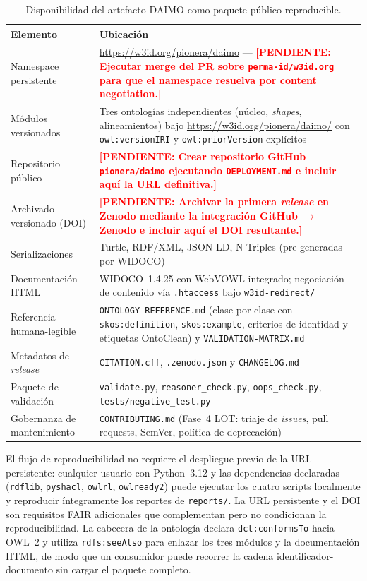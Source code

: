 \documentclass[11pt,a4paper]{article}
\newcommand{\code}[1]{\texttt{#1}}
\newcommand{\TODO}[1]{\textcolor{red}{\textbf{[PENDIENTE: #1]}}}
\begin{document}
\begin{table}[t]
\small\sf\centering
\caption{Disponibilidad del artefacto DAIMO como paquete público reproducible.\label{tab:avail}}
\begin{tabular}{@{}p{4cm}p{11cm}@{}}
\toprule
\textbf{Elemento} & \textbf{Ubicación} \\
\midrule
Namespace persistente & \url{https://w3id.org/pionera/daimo} --- \TODO{Ejecutar merge del PR sobre \texttt{perma-id/w3id.org} para que el namespace resuelva por content negotiation.} \\
Módulos versionados & Tres ontologías independientes (núcleo, \emph{shapes}, alineamientos) bajo \url{https://w3id.org/pionera/daimo/} con \code{owl:versionIRI} y \code{owl:priorVersion} explícitos \\
Repositorio público & \TODO{Crear repositorio GitHub \texttt{pionera/daimo} ejecutando \texttt{DEPLOYMENT.md} e incluir aquí la URL definitiva.} \\
Archivado versionado (DOI) & \TODO{Archivar la primera \emph{release} en Zenodo mediante la integración GitHub $\to$ Zenodo e incluir aquí el DOI resultante.} \\
Serializaciones & Turtle, RDF/XML, JSON-LD, N-Triples (pre-generadas por WIDOCO) \\
Documentación HTML & WIDOCO~1.4.25 con WebVOWL integrado; negociación de contenido vía \code{.htaccess} bajo \code{w3id-redirect/} \\
Referencia humana-legible & \code{ONTOLOGY-REFERENCE.md} (clase por clase con \code{skos:definition}, \code{skos:example}, criterios de identidad y etiquetas OntoClean) y \code{VALIDATION-MATRIX.md} \\
Metadatos de \emph{release} & \code{CITATION.cff}, \code{.zenodo.json} y \code{CHANGELOG.md} \\
Paquete de validación & \code{validate.py}, \code{reasoner\_check.py}, \code{oops\_check.py}, \code{tests/negative\_test.py} \\
Gobernanza de mantenimiento & \code{CONTRIBUTING.md} (Fase~4 LOT: triaje de \emph{issues}, pull requests, SemVer, política de deprecación) \\
\bottomrule
\end{tabular}
\end{table}

El flujo de reproducibilidad no requiere el despliegue previo de la URL persistente: cualquier usuario con Python~3.12 y las dependencias declaradas (\code{rdflib}, \code{pyshacl}, \code{owlrl}, \code{owlready2}) puede ejecutar los cuatro scripts localmente y reproducir íntegramente los reportes de \code{reports/}. La URL persistente y el DOI son requisitos FAIR adicionales que complementan pero no condicionan la reproducibilidad. La cabecera de la ontología declara \code{dct:conformsTo} hacia OWL~2 y utiliza \code{rdfs:seeAlso} para enlazar los tres módulos y la documentación HTML, de modo que un consumidor puede recorrer la cadena identificador-documento sin cargar el paquete completo.
\end{document}
